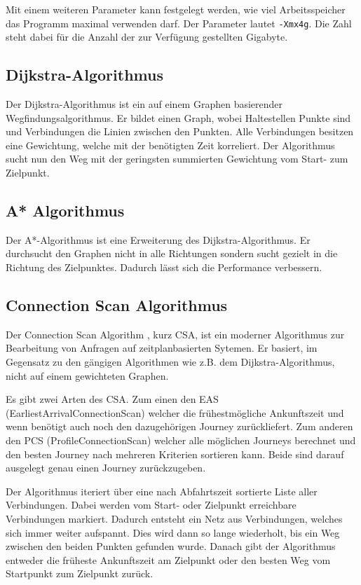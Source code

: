 Mit einem weiteren Parameter kann festgelegt werden, wie viel Arbeitsspeicher das Programm maximal verwenden darf. Der Parameter lautet \texttt{-Xmx4g}. Die Zahl steht dabei für die Anzahl der zur Verfügung gestellten Gigabyte.


\subsection{Dijkstra-Algorithmus}
Der \hypertarget{dij}{Dijkstra-Algorithmus} \cite{dij_bell} ist ein auf einem Graphen basierender Wegfindungsalgorithmus. Er bildet einen Graph, wobei Haltestellen Punkte sind und Verbindungen die Linien zwischen den Punkten. Alle Verbindungen besitzen eine Gewichtung, welche mit der benötigten Zeit korreliert. Der Algorithmus sucht nun den Weg mit der geringsten summierten Gewichtung vom Start- zum Zielpunkt.

\subsection{A* Algorithmus}
Der \hypertarget{A*}{A*-Algorithmus} \cite{dij_a} ist eine Erweiterung des Dijkstra-Algorithmus. Er durchsucht den Graphen nicht in alle Richtungen sondern sucht gezielt in die Richtung des Zielpunktes. Dadurch lässt sich die Performance verbessern.

\subsection{Connection Scan Algorithmus}
Der \hypertarget{CSA}{Connection Scan Algorithm} \cite{csa} , kurz CSA,  ist ein moderner Algorithmus zur Bearbeitung von Anfragen auf zeitplanbasierten Sytemen. Er basiert, im Gegensatz zu den gängigen Algorithmen wie z.B. dem Dijkstra-Algorithmus, nicht auf einem gewichteten Graphen. \newline

Es gibt zwei Arten des CSA. Zum einen den EAS (EarliestArrivalConnectionScan) welcher die frühestmögliche Ankunftszeit und wenn benötigt auch noch den dazugehörigen Journey zurückliefert. Zum anderen den PCS (ProfileConnectionScan) welcher alle möglichen Journeys berechnet und den besten Journey nach mehreren Kriterien sortieren kann. Beide sind darauf ausgelegt genau einen Journey zurückzugeben. \newline

Der Algorithmus iteriert über eine nach Abfahrtszeit sortierte Liste aller Verbindungen. Dabei werden vom Start- oder Zielpunkt erreichbare Verbindungen markiert. Dadurch entsteht ein Netz aus Verbindungen, welches sich immer weiter aufspannt. Dies wird dann so lange wiederholt, bis ein Weg zwischen den beiden Punkten gefunden wurde. Danach gibt der Algorithmus entweder die früheste Ankunftszeit am Zielpunkt oder den besten Weg vom Startpunkt zum Zielpunkt zurück.




